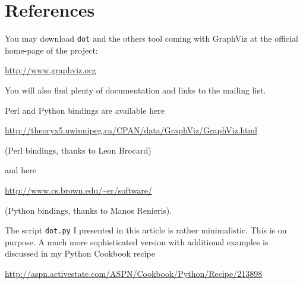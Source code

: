 \documentclass[10pt,english]{article}
\begin{document}

\hypertarget{references}{}
\section*{References}

You may download \texttt{dot} and the others tool coming with GraphViz at the
official home-page of the project:

\href{http://www.graphviz.org}{http://www.graphviz.org}

You will also find plenty of documentation and links to the mailing list.

Perl and Python bindings are available here

\href{http://theoryx5.uwinnipeg.ca/CPAN/data/GraphViz/GraphViz.html}{http://theoryx5.uwinnipeg.ca/CPAN/data/GraphViz/GraphViz.html}

(Perl bindings, thanks to Leon Brocard)

and here

\href{http://www.cs.brown.edu/~er/software/}{http://www.cs.brown.edu/{\textasciitilde}er/software/}

(Python bindings, thanks to Manos Renieris).

The script \texttt{dot.py} I presented in this article is rather minimalistic. 
This is on purpose. A much more sophisticated version with additional 
examples is discussed in my Python Cookbook recipe

\href{http://aspn.activestate.com/ASPN/Cookbook/Python/Recipe/213898}{http://aspn.activestate.com/ASPN/Cookbook/Python/Recipe/213898}
\end{document}

